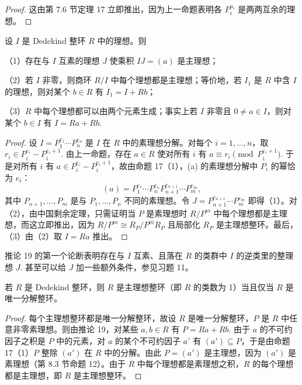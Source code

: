 \begin{proof}
这由第 7.6 节定理 17 立即推出，因为上一命题表明各 \(P_i^{a_i}\) 是两两互余的理想。
\end{proof}

\begin{corollary}\label{cor:16.19}
设 \(I\) 是 Dedekind 整环 \(R\) 中的理想。则

（1）存在与 \(I\) 互素的理想 \(J\) 使乘积 \(IJ = (a)\) 是主理想；

（2）若 \(I\) 非零，则商环 \(R/I\) 中每个理想都是主理想；等价地，若 \(I_1\) 是 \(R\) 中含 \(I\) 的理想，则对某个 \(b \in R\) 有 \(I_1 = I+Rb\)；

（3）\(R\) 中每个理想都可以由两个元素生成；事实上若 \(I\) 非零且 \(0 \neq a \in I\)，则对某个 \(b \in I\) 有 \(I = Ra+Rb\).
\end{corollary}

\begin{proof}
设 \(I = P_1^{e_1}\cdots P_n^{e_n}\) 是 \(I\) 在 \(R\) 中的素理想分解。对每个 \(i = 1, \ldots, n\)，取 \(r_i \in P_i^{e_i}-P_i^{e_i+1}\). 由上一命题，存在 \(a \in R\) 使对所有 \(i\) 有 \(a \equiv r_i \pmod{P_i^{e_i+1}}\). 于是对所有 \(i\) 有 \(a \in P_i^{e_i}-P_i^{e_i+1}\)，故由命题 17（1），(a) 的素理想分解中 \(P_i\) 的幂恰为 \(e_i\)：
\[
(a) = P_1^{e_1}\cdots P_n^{e_n}P_{n+1}^{e_{n+1}}\cdots P_m^{e_m},
\]
其中 \(P_{n+1}, \ldots, P_m\) 是与 \(P_1, \ldots, P_n\) 不同的素理想。令 \(J = P_{n+1}^{e_{n+1}}\cdots P_m^{e_m}\) 即得（1）。对（2），由中国剩余定理，只需证明当 \(P\) 是素理想时 \(R/P^m\) 中每个理想都是主理想，而这立即推出，因为 \(R/P^m \cong R_P/P^mR_P\) 且局部化 \(R_P\) 是主理想整环。最后，（3）由（2）取 \(I = Ra\) 推出。
\end{proof}

推论 19 的第一个论断表明存在与 \(I\) 互素、且落在 \(R\) 的类群中 \(I\) 的逆类里的整理想 \(J\). 甚至可以给 \(J\) 加一些额外条件，参见习题 11。

\begin{corollary}\label{cor:16.20}
若 \(R\) 是 Dedekind 整环，则 \(R\) 是主理想整环（即 \(R\) 的类数为 1）当且仅当 \(R\) 是唯一分解整环。
\end{corollary}

\begin{proof}
每个主理想整环都是唯一分解整环，故设 \(R\) 是唯一分解整环，\(P\) 是 \(R\) 中任意非零素理想。则由推论 19，对某些 \(a, b \in R\) 有 \(P = Ra+Rb\). 由于 \(a\) 的不可约因子之积是 \(P\) 中的元素，对 \(a\) 的某个不可约因子 \(a'\) 有 \((a') \subseteq P\)，于是由命题 17（1）\(P\) 整除 \((a')\) 在 \(R\) 中的分解。由此 \(P = (a')\) 是主理想，因为 \((a')\) 是素理想（第 8.3 节命题 12）。由于 \(R\) 中每个理想都是素理想之积，\(R\) 的每个理想都是主理想，即 \(R\) 是主理想整环。
\end{proof}


